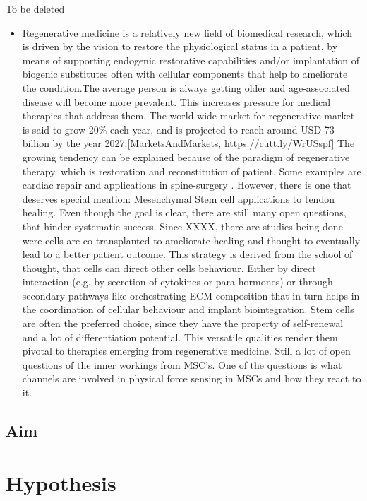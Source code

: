 To be deleted 
\begin{itemize}
    \item Regenerative medicine is a relatively new field of biomedical research, which is driven by the vision to restore the physiological status in a patient, by means of supporting endogenic restorative capabilities and/or implantation of biogenic substitutes often with cellular components that help to ameliorate the condition.The average person is always getting older and age-associated disease will become more prevalent. This increases pressure for medical therapies that address them. The world wide market for regenerative market is said to grow 20\% each year, and is projected to reach around USD 73 billion by the year 2027.[MarketsAndMarkets, https://cutt.ly/WrUSspf] The growing tendency can be explained because of the paradigm of regenerative therapy, which is restoration and reconstitution of patient. Some examples are cardiac repair \cite{Pittenger2014} and applications in spine-surgery \cite{Goldschlager2010}. However, there is one that deserves special mention: Mesenchymal Stem cell applications to tendon healing. Even though the goal is clear, there are still many open questions, that hinder systematic success. Since XXXX, there are studies being done were cells are co-transplanted to ameliorate healing and thought to eventually lead to a better patient outcome. This strategy is derived from the school of thought, that cells can direct other cells behaviour. Either by direct interaction (e.g. by secretion of cytokines or para-hormones) or through secondary pathways like orchestrating ECM-composition that in turn helps in the coordination of cellular behaviour and implant biointegration. Stem cells are often the preferred choice, since they have the property of self-renewal and a lot of differentiation potential. 
 This versatile qualities render them pivotal to therapies emerging from regenerative medicine. Still a lot of open questions of the inner workings from MSC's. One of the questions is what channels are involved in physical force sensing in MSCs and how they react to it. 
\end{itemize}

\subsection{Aim}


\section{Hypothesis}

